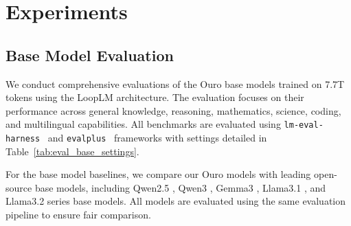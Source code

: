 \documentclass[]{bytedance_seed}
\newcommand{\1}{\mathbf{1}}
\newcommand{\ut}{LoopLM}
\begin{document}
\section{Experiments}
\subsection{Base Model Evaluation}

We conduct comprehensive evaluations of the Ouro base models trained on 7.7T tokens using the \ut{} architecture. The evaluation focuses on their performance across general knowledge, reasoning, mathematics, science, coding, and multilingual capabilities. All benchmarks are evaluated using \texttt{lm-eval-harness}~\citep{eval-harness} and \texttt{evalplus}~\citep{evalplus} frameworks with settings detailed in Table~\ref{tab:eval_base_settings}.

For the base model baselines, we compare our Ouro models with leading open-source base models, including Qwen2.5 \citep{qwen2}, Qwen3 \citep{qwen3}, Gemma3 \citep{team2025gemma3}, Llama3.1 \citep{dubey2024llama}, and Llama3.2 \citep{dubey2024llama} series base models. All models are evaluated using the same evaluation pipeline to ensure fair comparison.
\end{document}
